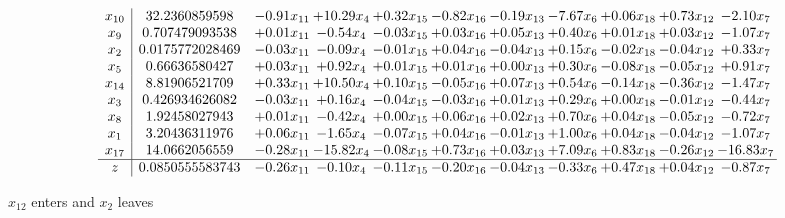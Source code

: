 \documentclass[9pt]{article}
\begin{document}
 \[\begin{array}{c| c c@{\hskip 2pt} c@{\hskip 2pt} c@{\hskip 2pt} c@{\hskip 2pt} c@{\hskip 2pt} c@{\hskip 2pt} c@{\hskip 2pt} c@{\hskip 2pt} c@{\hskip 2pt} }
 x_{10}   &  32.2360859598 & -0.91 x_{11} & + 10.29 x_{4} & +  0.32 x_{15} & -0.82 x_{16} & -0.19 x_{13} & -7.67 x_{6} & +  0.06 x_{18} & +  0.73 x_{12} & -2.10 x_{7}\\
 x_{9}   &  0.707479093538 & +  0.01 x_{11} & -0.54 x_{4} & -0.03 x_{15} & +  0.03 x_{16} & +  0.05 x_{13} & +  0.40 x_{6} & +  0.01 x_{18} & +  0.03 x_{12} & -1.07 x_{7}\\
 x_{2}   &  0.0175772028469 & -0.03 x_{11} & -0.09 x_{4} & -0.01 x_{15} & +  0.04 x_{16} & -0.04 x_{13} & +  0.15 x_{6} & -0.02 x_{18} & -0.04 x_{12} & +  0.33 x_{7}\\
 x_{5}   &  0.66636580427 & +  0.03 x_{11} & +  0.92 x_{4} & +  0.01 x_{15} & +  0.01 x_{16} & +  0.00 x_{13} & +  0.30 x_{6} & -0.08 x_{18} & -0.05 x_{12} & +  0.91 x_{7}\\
 x_{14}   &  8.81906521709 & +  0.33 x_{11} & + 10.50 x_{4} & +  0.10 x_{15} & -0.05 x_{16} & +  0.07 x_{13} & +  0.54 x_{6} & -0.14 x_{18} & -0.36 x_{12} & -1.47 x_{7}\\
 x_{3}   &  0.426934626082 & -0.03 x_{11} & +  0.16 x_{4} & -0.04 x_{15} & -0.03 x_{16} & +  0.01 x_{13} & +  0.29 x_{6} & +  0.00 x_{18} & -0.01 x_{12} & -0.44 x_{7}\\
 x_{8}   &  1.92458027943 & +  0.01 x_{11} & -0.42 x_{4} & +  0.00 x_{15} & +  0.06 x_{16} & +  0.02 x_{13} & +  0.70 x_{6} & +  0.04 x_{18} & -0.05 x_{12} & -0.72 x_{7}\\
 x_{1}   &  3.20436311976 & +  0.06 x_{11} & -1.65 x_{4} & -0.07 x_{15} & +  0.04 x_{16} & -0.01 x_{13} & +  1.00 x_{6} & +  0.04 x_{18} & -0.04 x_{12} & -1.07 x_{7}\\
 x_{17}   &  14.0662056559 & -0.28 x_{11} & -15.82 x_{4} & -0.08 x_{15} & +  0.73 x_{16} & +  0.03 x_{13} & +  7.09 x_{6} & +  0.83 x_{18} & -0.26 x_{12} & -16.83 x_{7}\\
\hline
z    &  0.0850555583743 & -0.26 x_{11} & -0.10 x_{4} & -0.11 x_{15} & -0.20 x_{16} & -0.04 x_{13} & -0.33 x_{6} & +  0.47 x_{18} & +  0.04 x_{12} & -0.87 x_{7}\\
\end{array}\]


 $ x_{12} $ enters and $ x_{2} $ leaves 
\end{document}
